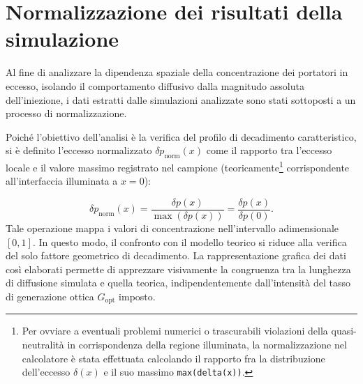 \documentclass[a4paper,11pt]{report}
\begin{document}
\section{Normalizzazione dei risultati della simulazione}
\label{sezione:norm}
Al fine di analizzare la dipendenza spaziale della concentrazione dei portatori in eccesso, isolando il comportamento diffusivo dalla magnitudo assoluta dell'iniezione, i dati estratti dalle simulazioni analizzate sono stati sottoposti a un processo di normalizzazione.

Poiché l'obiettivo dell'analisi è la verifica del profilo di decadimento caratteristico, si è definito l'eccesso normalizzato $\delta p_{\text{norm}}(x)$ come il rapporto tra l'eccesso locale e il valore massimo registrato nel campione (teoricamente\footnote{Per ovviare a eventuali problemi numerici o trascurabili violazioni della quasi-neutralità in corrispondenza della regione illuminata, la normalizzazione nel calcolatore è stata effettuata calcolando il rapporto fra la distribuzione dell'eccesso $\delta(x)$ e il suo massimo \texttt{max(delta(x))}.} corrispondente all'interfaccia illuminata a $x=0$):

\begin{equation}
    \delta p_{\text{norm}}(x) = \frac{\delta p(x)}{\max(\delta p(x))} = \frac{\delta p(x)}{\delta p(0)}.
\end{equation}
Tale operazione mappa i valori di concentrazione nell'intervallo adimensionale $[0, 1]$. In questo modo, il confronto con il modello teorico si riduce alla verifica del solo fattore geometrico di decadimento. La rappresentazione grafica dei dati così elaborati permette di apprezzare visivamente la congruenza tra la lunghezza di diffusione simulata e quella teorica, indipendentemente dall'intensità del tasso di generazione ottica $G_{\text{opt}}$ imposto.
\end{document}
